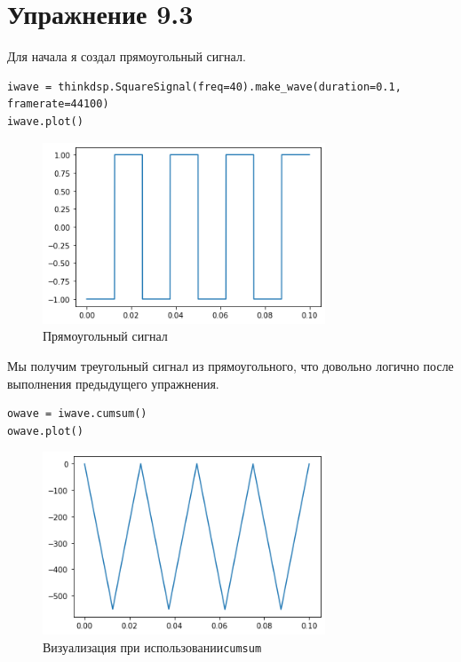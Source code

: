 \documentclass[a4paper,12pt]{report}
\begin{document}
\chapter{Упражнение 9.3}

Для начала я создал прямоугольный сигнал.

\begin{lstlisting}[caption=Создание сигнала]
iwave = thinkdsp.SquareSignal(freq=40).make_wave(duration=0.1, framerate=44100)
iwave.plot()
\end{lstlisting}

\begin{figure}[H]
        \centering
        \includegraphics[width=0.75\textwidth]{4.png}
        \caption{Прямоугольный сигнал}
        \label{4}
\end{figure}

Мы получим треугольный сигнал из прямоугольного, что довольно логично после выполнения предыдущего упражнения.

\begin{lstlisting}[caption=Визуализация при \texttt{cumsum}]
owave = iwave.cumsum()
owave.plot()
\end{lstlisting}

\begin{figure}[H]
        \centering
        \includegraphics[width=0.75\textwidth]{5.png}
        \caption{Визуализация при использовании\texttt{cumsum}}
        \label{5}
\end{figure}
\end{document}
